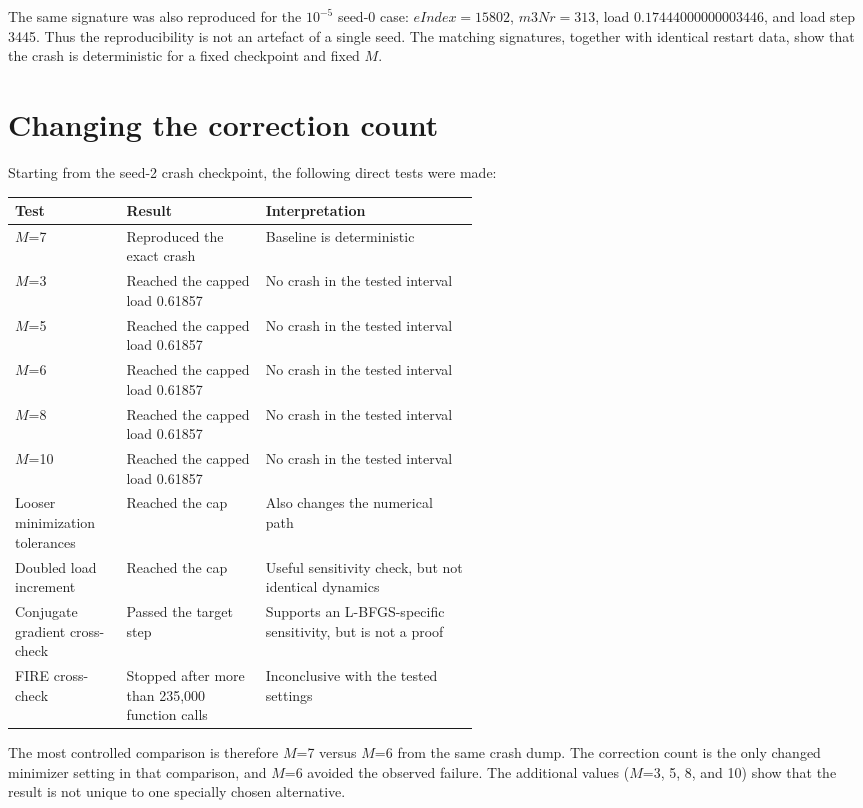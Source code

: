 \documentclass[11pt]{article}
\newcommand{\M}{\ensuremath{M}}
\newcommand{\lbfgs}{L-BFGS}
\begin{document}
The same signature was also reproduced for the $10^{-5}$ seed-0 case: $eIndex=15802$, $m3Nr=313$, load $0.17444000000003446$, and load step 3445.  Thus the reproducibility is not an artefact of a single seed.  The matching signatures, together with identical restart data, show that the crash is deterministic for a fixed checkpoint and fixed \M.

\section{Changing the correction count}

Starting from the seed-2 crash checkpoint, the following direct tests were made:

\begin{center}
\small
\renewcommand{\arraystretch}{1.15}
\begin{tabularx}{0.95\linewidth}{@{}P{0.24\linewidth} P{0.30\linewidth} Y@{}}
\toprule
Test & Result & Interpretation \\
\midrule
\M=7 & Reproduced the exact crash & Baseline is deterministic \\
\M=3 & Reached the capped load 0.61857 & No crash in the tested interval \\
\M=5 & Reached the capped load 0.61857 & No crash in the tested interval \\
\M=6 & Reached the capped load 0.61857 & No crash in the tested interval \\
\M=8 & Reached the capped load 0.61857 & No crash in the tested interval \\
\M=10 & Reached the capped load 0.61857 & No crash in the tested interval \\
\midrule
Looser minimization tolerances & Reached the cap & Also changes the numerical path \\
Doubled load increment & Reached the cap & Useful sensitivity check, but not identical dynamics \\
Conjugate gradient cross-check & Passed the target step & Supports an \lbfgs-specific sensitivity, but is not a proof \\
FIRE cross-check & Stopped after more than 235,000 function calls & Inconclusive with the tested settings \\
\bottomrule
\end{tabularx}
\normalsize
\end{center}

The most controlled comparison is therefore \M=7 versus \M=6 from the same crash dump.  The correction count is the only changed minimizer setting in that comparison, and \M=6 avoided the observed failure.  The additional values (\M=3, 5, 8, and 10) show that the result is not unique to one specially chosen alternative.
\end{document}
